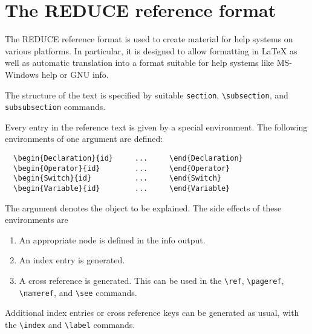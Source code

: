 \newpage
\section{The REDUCE reference format}

The REDUCE reference format is used to create material for help systems on
various platforms.  In particular, it is designed to allow formatting in
\LaTeX{} as well as automatic translation into a format suitable for
help systems like MS-Windows help or GNU info.

The structure of the text is specified by suitable \verb|section|,
\verb|\subsection|, and \verb|subsubsection| commands.

Every entry in the reference text is given by a special environment.
The following environments of one argument are defined:
\begin{verbatim}
  \begin{Declaration}{id}     ...     \end{Declaration}
  \begin{Operator}{id}        ...     \end{Operator}
  \begin{Switch}{id}          ...     \end{Switch}
  \begin{Variable}{id}        ...     \end{Variable}
\end{verbatim}
The argument denotes the object to be explained. The side effects of
these environments are
\begin{enumerate}
  \item An appropriate node is defined in the info output.
  \item An index entry is generated.
  \item A cross reference is generated. This can be used in the
        \verb|\ref|, \verb|\pageref|, \verb|\nameref|, and \verb|\see|
        commands.
\end{enumerate}
Additional index entries or cross reference keys can be generated as usual,
with the \verb|\index| and \verb|\label| commands.


